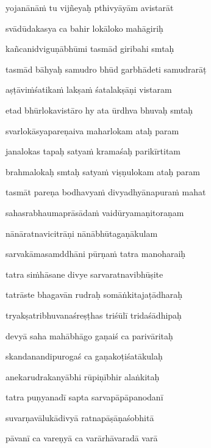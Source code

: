 yojanānāṁ tu vijñeyaḥ pthivyāyām avistarāt \veg\dontdisplaylinenum

svādūdakasya ca bahir lokāloko mahāgiriḥ\thinspace{\dandab} \dontdisplaylinenum

kañcanidviguṇābhūmi tasmād giribahi smtaḥ \veg\dontdisplaylinenum

tasmād bāhyaḥ samudro bhūd garbhādeti samudrarāṭ\thinspace{\dandab} \dontdisplaylinenum

aṣṭāviṁśatikaṁ lakṣaṁ śatalakṣāṇi vistaram \veg\dontdisplaylinenum

etad bhūrlokavistāro hy ata ūrdhva bhuvaḥ smtaḥ\thinspace{\dandab} \dontdisplaylinenum

svarlokāsyapareṇaiva maharlokam ataḥ param \veg\dontdisplaylinenum

janalokas tapaḥ satyaṁ kramaśaḥ parikīrtitam\thinspace{\dandab} \dontdisplaylinenum

brahmalokaḥ smtaḥ satyaṁ viṣṇulokam ataḥ param \veg\dontdisplaylinenum


tasmāt pareṇa bodhavyaṁ divyadhyānapuraṁ mahat\thinspace{\dandab} \dontdisplaylinenum

sahasrabhaumaprāsādaṁ vaidūryamaṇitoraṇam \veg\dontdisplaylinenum

nānāratnavicitrāṇi nānābhūtagaṇākulam\thinspace{\dandab} \dontdisplaylinenum

sarvakāmasamddhāni pūrṇaṁ tatra manoharaiḥ \veg\dontdisplaylinenum

tatra siṁhāsane divye sarvaratnavibhūṣite\thinspace{\dandab} \dontdisplaylinenum

tatrāste bhagavān rudraḥ somāṅkitajaṭādharaḥ \veg\dontdisplaylinenum

tryakṣatribhuvanaśreṣṭhas triśūlī tridaśādhipaḥ\thinspace{\dandab} \dontdisplaylinenum

devyā saha mahābhāgo gaṇaiś ca parivāritaḥ \veg\dontdisplaylinenum

skandanandipurogaś ca gaṇakoṭiśatākulaḥ\thinspace{\dandab} \dontdisplaylinenum

anekarudrakanyābhi rūpiṇībhir alaṅkitaḥ \veg\dontdisplaylinenum
{}

tatra puṇyanadī sapta sarvapāpāpanodanī\thinspace{\dandab} \dontdisplaylinenum

suvarṇavālukādivyā ratnapāṣāṇaśobhitā \veg\dontdisplaylinenum

pāvanī ca vareṇyā ca varārhāvaradā varā\thinspace{\dandab} \dontdisplaylinenum

